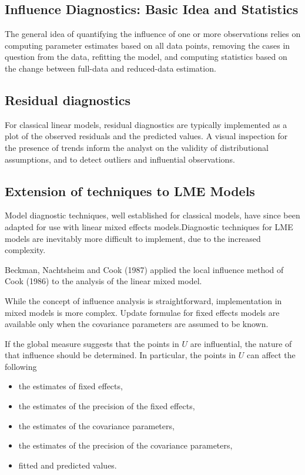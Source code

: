 \documentclass[12pt, a4paper]{article}
\begin{document}
			\subsection*{Influence Diagnostics: Basic Idea and Statistics} %
			
			The general idea of quantifying the influence of one or more observations relies on computing parameter estimates based on all data points, removing the cases in question from the data, refitting the model, and computing statistics based on the change between full-data and reduced-data estimation. 
			
			\subsection{Residual diagnostics} %
			For classical linear models, residual diagnostics are typically implemented as a plot of the observed residuals and the predicted values. A visual inspection for the presence of trends inform the analyst on the validity of distributional assumptions, and to detect outliers and influential observations.
			
			
			\subsection*{Extension of techniques to LME Models} %
			
			Model diagnostic techniques, well established for classical models, have since been adapted for use with linear mixed effects models.Diagnostic techniques for LME models are inevitably more difficult to implement, due to the increased complexity.
			
			Beckman, Nachtsheim and Cook (1987)  applied the local influence method of Cook (1986) to the analysis of the linear mixed model.
			
			While the concept of influence analysis is straightforward, implementation in mixed models is more complex. Update formulae for fixed effects models are available only when the covariance parameters are assumed to be known.
			
			If the global measure suggests that the points in $U$ are influential, the nature of that influence should be determined. In particular, the points in $U$ can affect the following
			
			\begin{itemize}
				\item the estimates of fixed effects,
				\item the estimates of the precision of the fixed effects,
				\item the estimates of the covariance parameters,
				\item the estimates of the precision of the covariance parameters,
				\item fitted and predicted values.
			\end{itemize}
			
\end{document}
